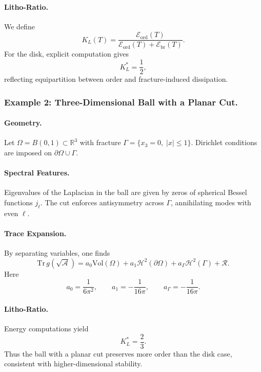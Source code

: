 \paragraph{Litho-Ratio.}
We define
\[
K_L(T) = \frac{\mathcal{E}_{\mathrm{ord}}(T)}
{\mathcal{E}_{\mathrm{ord}}(T)+\mathcal{E}_{\mathrm{br}}(T)}.
\]
For the disk, explicit computation gives
\[
K_L^* = \frac{1}{2},
\]
reflecting equipartition between order and fracture-induced dissipation.


\subsubsection{Example 2: Three-Dimensional Ball with a Planar Cut.}

\paragraph{Geometry.}
Let $\Omega = B(0,1) \subset \mathbb{R}^3$ with fracture
$\Gamma = \{x_3=0, \; |x|\le 1\}$.
Dirichlet conditions are imposed on $\partial\Omega \cup \Gamma$.

\paragraph{Spectral Features.}
Eigenvalues of the Laplacian in the ball are given by zeros of
spherical Bessel functions $j_\ell$.
The cut enforces antisymmetry across $\Gamma$, annihilating modes with
even $\ell$.

\paragraph{Trace Expansion.}
By separating variables, one finds
\[
\mathrm{Tr}\,g(\sqrt{\mathcal{A}})
= a_0 \mathrm{Vol}(\Omega) + a_1 \mathcal{H}^2(\partial\Omega)
+ a_\Gamma \mathcal{H}^2(\Gamma) + \mathcal{R}.
\]
Here
\[
a_0 = \frac{1}{6\pi^2}, \qquad
a_1 = -\frac{1}{16\pi}, \qquad
a_\Gamma = -\frac{1}{16\pi}.
\]

\paragraph{Litho-Ratio.}
Energy computations yield
\[
K_L^* = \frac{2}{3}.
\]
Thus the ball with a planar cut preserves more order than the disk case,
consistent with higher-dimensional stability.

